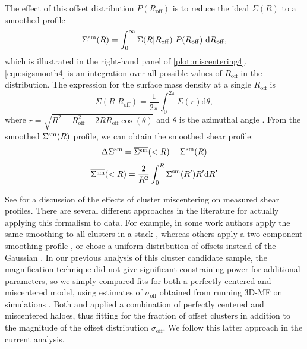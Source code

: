 The effect of this offset distribution $P(R_{\mathrm{off}})$ is to reduce the ideal $\Sigma(R)$ to a smoothed profile \citep[see e.g.][]{Johnston07,George12}
\begin{equation}
\label{eqn:sigsmooth4}
\Sigma^{\rm sm}(R)=\int_{0}^{\infty} \Sigma(R|R_{\mathrm{off}})\ P(R_{\mathrm{off}})\ \mathrm{d}R_{\mathrm{off}},
\end{equation}
which is illustrated in the right-hand panel of \autoref{plot:miscentering4}. \autoref{eqn:sigsmooth4} is an integration over all possible values of $R_{\mathrm{off}}$ in the distribution. The expression for the surface mass density at a single $R_{\mathrm{off}}$ is
\begin{equation}
\Sigma(R|R_{\mathrm{off}})=\frac{1}{2\pi}\int_{0}^{2\pi}\Sigma(r) \mathrm{d}\theta,
\end{equation}
where $r = \sqrt{R^2+R_{\mathrm{off}}^2-2RR_{\mathrm{off}}\cos(\theta)}$ and $\theta$ is the azimuthal angle \citep{Yang06}. From the smoothed $\Sigma^{\rm sm}(R)$ profile, we can obtain the smoothed shear profile:
\begin{equation}
\Delta\Sigma^{\rm sm} = \overline{\Sigma^{\rm sm}}(<R) - \Sigma^{\rm sm}(R)
\end{equation}
\begin{equation}
\overline{\Sigma^{\rm sm}}(<R) = \frac{2}{R^2} \int_{0}^{R} \Sigma^{\rm sm}(R')R'\mathrm{d}R'
\end{equation}

See \citet{George12} for a discussion of the effects of cluster miscentering on measured shear profiles. There are several different approaches in the literature for actually applying this formalism to data. For example, in some work authors apply the same smoothing to all clusters in a stack \citep{George12}, whereas others apply a two-component smoothing profile \citep{Oguri14}, or chose a uniform distribution of offsets instead of the Gaussian \citep{Sehgal13}. In our previous analysis of this cluster candidate sample, the magnification technique did not give significant constraining power for additional parameters, so we simply compared fits for both a perfectly centered and miscentered model, using estimates of $\sigma_{\mathrm{off}}$ obtained from running \ac{3D-MF} on simulations \citep{Ford14}. Both \citet{Johnston07} and \citet{Covone14} applied a combination of perfectly centered and miscentered haloes, thus fitting for the fraction of offset clusters in addition to the magnitude of the offset distribution $\sigma_{\mathrm{off}}$. We follow this latter approach in the current analysis.

